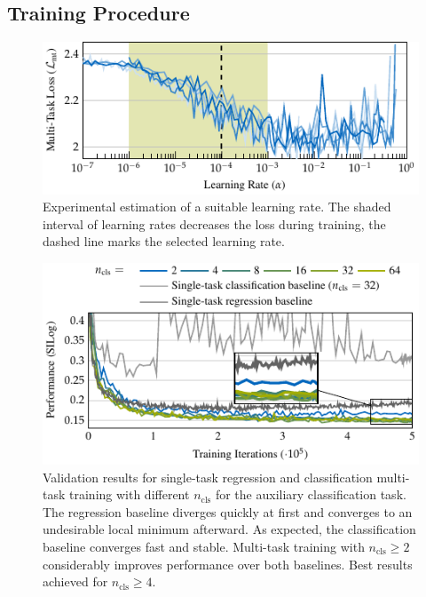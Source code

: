 \documentclass[lang=english]{tumarxivarticle}
\begin{document}
\subsection{Training Procedure}

\begin{figure}
  \includegraphics{tikz/multidepth_arxiv-figure2}
  \caption{Experimental estimation of a suitable learning rate. The shaded interval of learning rates decreases the loss during training, the dashed line marks the selected learning rate.}
  \label{fig:hyperparameter_tuning_lr}
\end{figure}

\begin{figure}
  \includegraphics{tikz/multidepth_arxiv-figure3}
  \caption{Validation results for single-task regression and classification \vs multi-task training with different $n_\text{cls}$ for the auxiliary classification task.
  The regression baseline diverges quickly at first and converges to an undesirable local minimum afterward.
  As expected, the classification baseline converges fast and stable.
  Multi-task training with $n_\text{cls} \geq 2$ considerably improves performance over both baselines.
  Best results achieved for $n_\text{cls} \geq 4$.}
  \label{fig:ablation_nclasses}
\end{figure}
\end{document}
